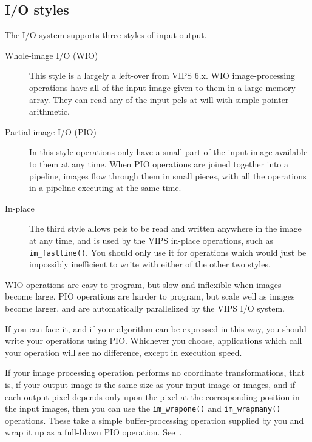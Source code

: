 \subsection{I/O styles}

The I/O system supports three styles of input-output. 

\begin{description}

\item[Whole-image I/O (WIO)]
This style is a largely a left-over from VIPS 6.x. WIO image-processing
operations have all of the input image given to them in a large memory
array. They can read any of the input pels at will with simple pointer
arithmetic.

\item[Partial-image I/O (PIO)]
In this style operations only have a small part of the input image available
to them at any time. When PIO operations are joined together into a pipeline,
images flow through them in small pieces, with all the operations in a
pipeline executing at the same time. 

\item[In-place]
The third style allows pels to be read and written anywhere in
the image at any time, and is used by the VIPS in-place operations, such
as \verb+im_fastline()+. You should only use it for operations which would
just be impossibly inefficient to write with either of the other two styles.

\end{description}

WIO operations are easy to program, but slow and inflexible when images
become large. PIO operations are harder to program, but scale well as images
become larger, and are automatically parallelized by the VIPS I/O system.

If you can face it, and if your algorithm can be expressed in this way, you
should write your operations using PIO.  Whichever you choose, applications
which call your operation will see no difference, except in execution speed.

If your image processing operation performs no coordinate transformations,
that is, if your output image is the same size as your input image or images,
and if each output pixel depends only upon the pixel at the corresponding
position in the input images, then you can use the \verb+im_wrapone()+
and \verb+im_wrapmany()+ operations. These take a simple buffer-processing
operation supplied by you and wrap it up as a full-blown PIO operation. 
See~.

